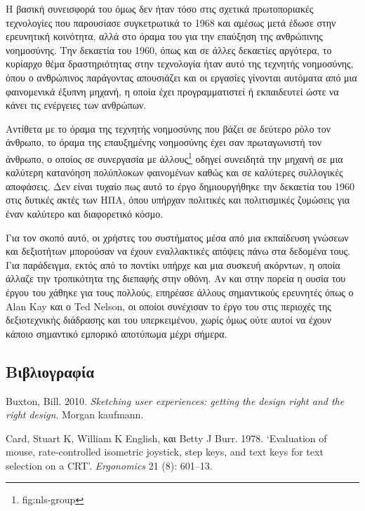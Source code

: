 \documentclass[
]{article}
\newlength{\cslhangindent}
\newlength{\cslentryspacingunit} %
\newenvironment{CSLReferences}[2] %
 {%
  \setlength{\parindent}{0pt}
  \ifodd #1
  \let\oldpar\par
  \def\par{\hangindent=\cslhangindent\oldpar}
  \fi
  \setlength{\parskip}{#2\cslentryspacingunit}
 }%
 {}
\begin{document}
Η βασική συνεισφορά του όμως δεν ήταν τόσο στις σχετικά πρωτοποριακές
τεχνολογίες που παρουσίασε συγκετρωτικά το 1968 και αμέσως μετά έδωσε
στην ερευνητική κοινότητα, αλλά στο όραμα του για την επαύξηση της
ανθρώπινης νοημοσύνης. Την δεκαετία του 1960, όπως και σε άλλες
δεκαετίες αργότερα, το κυρίαρχο θέμα δραστηριότητας στην τεχνολογία ήταν
αυτό της τεχνητής νοημοσύνης, όπου ο ανθρώπινος παράγοντας απουσιάζει
και οι εργασίες γίνονται αυτόματα από μια φαινομενικά έξυπνη μηχανή, η
οποία έχει προγραμματιστεί ή εκπαιδευτεί ώστε να κάνει τις ενέργειες των
ανθρώπων.

Αντίθετα με το όραμα της τεχνητής νοημοσύνης που βάζει σε δεύτερο ρόλο
τον άνθρωπο, το όραμα της επαυξημένης νοημοσύνης έχει σαν πρωταγωνιστή
τον άνθρωπο, ο οποίος σε συνεργασία με άλλους\footnote{fig:nls-group}
οδηγεί συνειδητά την μηχανή σε μια καλύτερη κατανόηση πολύπλοκων
φαινομένων καθώς και σε καλύτερες συλλογικές αποφάσεις. Δεν είναι τυχαίο
πως αυτό το έργο δημιουργήθηκε την δεκαετία του 1960 στις δυτικές ακτές
των ΗΠΑ, όπου υπήρχαν πολιτικές και πολιτισμικές ζυμώσεις για έναν
καλύτερο και διαφορετικό κόσμο.

Για τον σκοπό αυτό, οι χρήστες του συστήματος μέσα από μια εκπαίδευση
γνώσεων και δεξιοτήτων μπορούσαν να έχουν εναλλακτικές απόψεις πάνω στα
δεδομένα τους. Για παράδειγμα, εκτός από το ποντίκι υπήρχε και μια
συσκευή ακόρντων, η οποία άλλαζε την τροπικότητα της διεπαφής στην
οθόνη. Αν και στην πορεία η ουσία του έργου του χάθηκε για τους πολλούς,
επηρέασε άλλους σημαντικούς ερευνητές όπως ο Alan Kay και ο Ted Nelson,
οι οποίοι συνέχισαν το έργο του στις περιοχές της δεξιοτεχνικής
διάδρασης και του υπερκειμένου, χωρίς όμως ούτε αυτοί να έχουν κάποιο
σημαντικό εμπορικό αποτύπωμα μέχρι σήμερα.

\hypertarget{ux3b2ux3b9ux3b2ux3bbux3b9ux3bfux3b3ux3c1ux3b1ux3c6ux3afux3b1}{%
\subsection*{Βιβλιογραφία}\label{ux3b2ux3b9ux3b2ux3bbux3b9ux3bfux3b3ux3c1ux3b1ux3c6ux3afux3b1}}

\hypertarget{refs}{}
\begin{CSLReferences}{0}{0}
\end{CSLReferences}

Buxton, Bill. 2010. \emph{Sketching user experiences: getting the design
right and the right design}. Morgan kaufmann.

Card, Stuart K, William K English, και Betty J Burr. 1978. {`Evaluation
of mouse, rate-controlled isometric joystick, step keys, and text keys
for text selection on a CRT'}. \emph{Ergonomics} 21 (8): 601--13.
\end{document}
